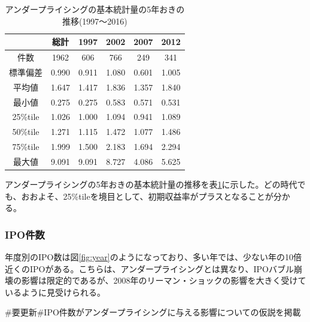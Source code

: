 \documentclass{jsarticle}
\begin{document}
\begin{table}[h]
  \begin{center}
  \caption{アンダープライシングの基本統計量の5年おきの推移(1997〜2016)}
\begin{tabular*}{120mm}{@{\extracolsep{\fill}}c|ccccc}

\hline
\  & 総計 &  1997 &  2002&   2007  & 2012 \\
\hline \hline
件数 &1962 & 606 & 766 & 249 & 341 \\
\hline
標準偏差&       0.990  &0.911  &1.080 & 0.601 & 1.005 \\
\hline
平均値   &  1.647 & 1.417 & 1.836 & 1.357 & 1.840 \\
\hline
最小値    &     0.275 & 0.275 & 0.583 & 0.571&  0.531 \\
25\%tile   &       1.026 & 1.000  &1.094 & 0.941 & 1.089 \\
50\%tile    &      1.271&  1.115 & 1.472 & 1.077  &1.486 \\
75\%tile     &     1.999 & 1.500 & 2.183  &1.694 & 2.294 \\
最大値  &   9.091 & 9.091&  8.727 & 4.086 & 5.625 \\
\hline
	\end{tabular*}
	\label{stats} 
  \end{center}
\end{table}

アンダープライシングの5年おきの基本統計量の推移を表\ref{stats}に示した。どの時代でも、おおよそ、25\%tileを境目として、初期収益率がプラスとなることが分かる。\par

\subsubsection{IPO件数}
年度別のIPO数は図\ref{fig:year}のようになっており、多い年では、少ない年の10倍近くのIPOがある。こちらは、アンダープライシングとは異なり、IPOバブル崩壊の影響は限定的であるが、2008年のリーマン・ショックの影響を大きく受けているように見受けられる。

\#要更新\#IPO件数がアンダープライシングに与える影響についての仮説を掲載
\end{document}
